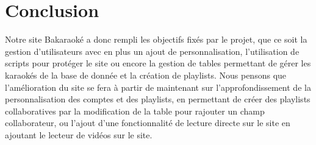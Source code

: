 \section{Conclusion}
Notre site Bakaraoké a donc rempli les objectifs fixés par le projet, que ce soit la gestion d'utilisateurs
avec en plus un ajout de personnalisation, l'utilisation de scripts pour protéger le site ou encore la gestion
de tables permettant de gérer les karaokés de la base de donnée et la création de playlists.\newline
\newline
Nous pensons que l'amélioration du site se fera à partir de maintenant sur l'approfondissement de la personnalisation des comptes
et des playlists, en permettant de créer des playlists collaboratives par la modification de la table pour rajouter un champ collaborateur,
ou l'ajout d'une fonctionnalité de lecture directe sur le site en ajoutant le lecteur de vidéos sur le site.